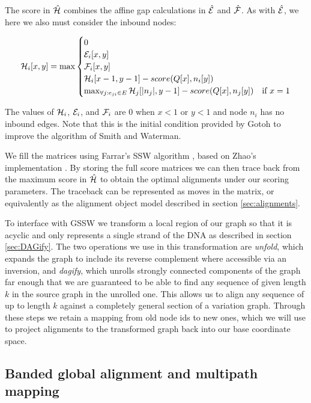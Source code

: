 The score in $\hat{\cal H}$ combines the affine gap calculations in $\hat{\cal E}$ and $\hat{\cal F}$.
As with $\hat{\cal E}$, we here we also must consider the inbound nodes:

\begin{equation}
  \label{eqn:gssw_h}
  {\cal H}_i[x,y] = \max
  \begin{cases}
    0 \\
    {\cal E}_i[x,y] \\
    {\cal F}_i[x,y] \\
    {\cal H}_i[x-1,y-1] - score(Q[x], n_i[y])\\
    \max_{\forall j : e_{ji} \in E} {\cal H}_j[|n_j|,y-1] - score(Q[x], n_j[y]) & \text{if } x = 1 \\
  \end{cases}
\end{equation}

The values of ${\cal H}_i$, ${\cal E}_i$, and ${\cal F}_i$ are 0 when $x < 1$ or $y < 1$ and node $n_i$ has no inbound edges.
Note that this is the initial condition provided by Gotoh to improve the algorithm of Smith and Waterman.

We fill the matrices using Farrar's SSW algorithm \cite{farrar2007striped}, based on Zhao's implementation \cite{zhao2013ssw}.
By storing the full score matrices we can then trace back from the maximum score in $\hat{\cal H}$ to obtain the optimal alignments under our scoring parameters.
The traceback can be represented as moves in the matrix, or equivalently as the alignment object model described in section \ref{sec:alignments}.

To interface with GSSW we transform a local region of our graph so that it is acyclic and only represents a single strand of the DNA as described in section \ref{sec:DAGify}.
The two operations we use in this transformation are \emph{unfold}, which expands the graph to include its reverse complement where accessible via an inversion, and \emph{dagify}, which unrolls strongly connected components of the graph far enough that we are guaranteed to be able to find any sequence of given length $k$ in the source graph in the unrolled one.
This allows us to align any sequence of up to length $k$ against a completely general section of a variation graph.
Through these steps we retain a mapping from old node ids to new ones, which we will use to project alignments to the transformed graph back into our base coordinate space.

\subsection{Banded global alignment and multipath mapping}
\label{sec:banded_global}

